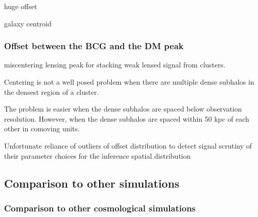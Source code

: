 huge offset

galaxy centroid 

\subsubsection{Offset between the BCG and the DM peak}
 
\cite{Zitrin2012}
\cite{Zitrin2012a}
\cite{Mohammed2014}
miscentering lensing peak for stacking weak lensed signal from clusters.  

Centering is not a well posed problem when there are multiple dense subhalos in the densest
region of a cluster.

The problem is easier when the dense subhalos are spaced below observation resolution. 
However, when the dense subhalos are spaced within 50 kpc of each other in
comoving units.  

Unfortunate reliance of outliers of offset distribution to detect signal 
scrutiny of their parameter choices for the inference spatial distribution 

\subsection{Comparison to other simulations}
\subsubsection{Comparison to other cosmological simulations}
 
